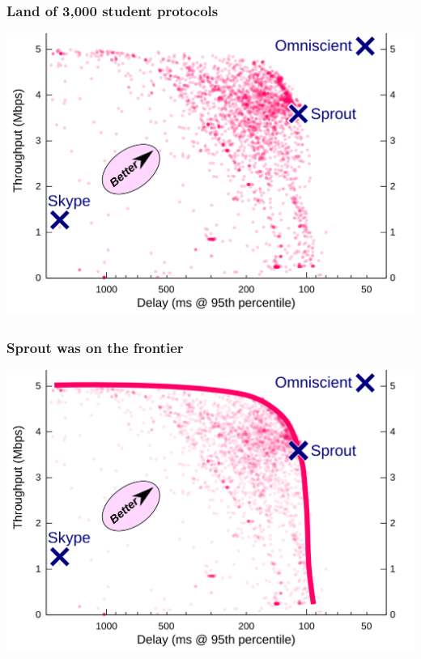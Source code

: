 \documentclass[svgnames]{beamer}
\begin{document}
\begin{frame}
\frametitle{Land of 3,000 student protocols}

\begin{centering}
\includegraphics[width=0.9\columnwidth]{pointplot.png}

\end{centering}

\end{frame}

\begin{frame}
\frametitle{Sprout was on the frontier}

\begin{centering}
\includegraphics[width=0.9\columnwidth]{pointplot-withhull.png}

\end{centering}

\end{frame}
\end{document}
